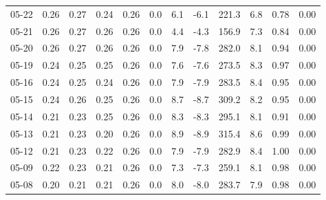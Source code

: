 \begin{threeparttable}
{\begin{tabular}{lrrrrrrrrrrr}
  05-22 &          0.26 &          0.27 &          0.24 &        0.26 &                 0.0 &                 6.1 &       -6.1 &               221.3 &              6.8 &            0.78 &                   0.00 \\
  05-21 &          0.26 &          0.27 &          0.26 &        0.26 &                 0.0 &                 4.4 &       -4.3 &               156.9 &              7.3 &            0.84 &                   0.00 \\
  05-20 &          0.26 &          0.27 &          0.26 &        0.26 &                 0.0 &                 7.9 &       -7.8 &               282.0 &              8.1 &            0.94 &                   0.00 \\
  05-19 &          0.24 &          0.25 &          0.25 &        0.26 &                 0.0 &                 7.6 &       -7.6 &               273.5 &              8.3 &            0.97 &                   0.00 \\
  05-16 &          0.24 &          0.25 &          0.24 &        0.26 &                 0.0 &                 7.9 &       -7.9 &               283.5 &              8.4 &            0.95 &                   0.00 \\
  05-15 &          0.24 &          0.26 &          0.25 &        0.26 &                 0.0 &                 8.7 &       -8.7 &               309.2 &              8.2 &            0.95 &                   0.00 \\
  05-14 &          0.21 &          0.23 &          0.25 &        0.26 &                 0.0 &                 8.3 &       -8.3 &               295.1 &              8.1 &            0.91 &                   0.00 \\
  05-13 &          0.21 &          0.23 &          0.20 &        0.26 &                 0.0 &                 8.9 &       -8.9 &               315.4 &              8.6 &            0.99 &                   0.00 \\
  05-12 &          0.21 &          0.23 &          0.22 &        0.26 &                 0.0 &                 7.9 &       -7.9 &               282.9 &              8.4 &            1.00 &                   0.00 \\
  05-09 &          0.22 &          0.23 &          0.21 &        0.26 &                 0.0 &                 7.3 &       -7.3 &               259.1 &              8.1 &            0.98 &                   0.00 \\
  05-08 &          0.20 &          0.21 &          0.21 &        0.26 &                 0.0 &                 8.0 &       -8.0 &               283.7 &              7.9 &            0.98 &                   0.00 \\

\end{tabular}}
\end{threeparttable}
